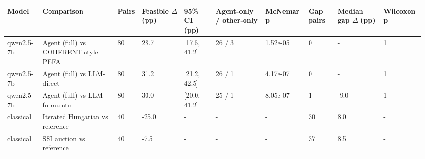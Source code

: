 \begin{tabular}{llllllllll}
\toprule
Model & Comparison & Pairs & Feasible $\Delta$ (pp) & 95\% CI (pp) & Agent-only / other-only & McNemar p & Gap pairs & Median gap $\Delta$ (pp) & Wilcoxon p \\
\midrule
qwen2.5-7b & Agent (full) vs COHERENT-style PEFA & 80 & 28.7 & [17.5, 41.2] & 26 / 3 & 1.52e-05 & 0 & - & 1 \\
qwen2.5-7b & Agent (full) vs LLM-direct & 80 & 31.2 & [21.2, 42.5] & 26 / 1 & 4.17e-07 & 0 & - & 1 \\
qwen2.5-7b & Agent (full) vs LLM-formulate & 80 & 30.0 & [20.0, 41.2] & 25 / 1 & 8.05e-07 & 1 & -9.0 & 1 \\
classical & Iterated Hungarian vs reference & 40 & -25.0 & - & - & - & 30 & 8.0 & - \\
classical & SSI auction vs reference & 40 & -7.5 & - & - & - & 37 & 8.5 & - \\
\bottomrule
\end{tabular}
